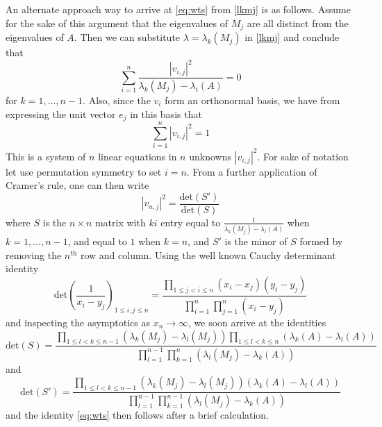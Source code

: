 \documentclass[12pt]{amsart}
\begin{document}
An alternate approach way to arrive at \eqref{eq:wts} from \eqref{lkmj} is as follows.  Assume for the sake of this argument that the eigenvalues of $M_j$ are all distinct from the eigenvalues of $A$.  Then we can substitute $\lambda = \lambda_k(M_j)$ in \eqref{lkmj} and conclude that
\begin{equation}\label{la}
\sum_{i=1}^n \frac{|v_{i,j}|^2}{\lambda_k(M_j) - \lambda_i(A)} = 0
\end{equation}
for $k=1,\dots,n-1$.  Also, since the $v_i$ form an orthonormal basis, we have from expressing the unit vector $e_j$ in this basis that
\begin{equation}\label{vij}
 \sum_{i=1}^n |v_{i,j}|^2 = 1
\end{equation}
This is a system of $n$ linear equations in $n$ unknowns $|v_{i,j}|^2$.  For sake of notation let use permutation symmetry to set $i=n$.  From a further application of Cramer's rule, one can then write
$$ |v_{n,j}|^2 = \frac{\mathrm{det}(S')}{\mathrm{det}(S)}$$
where $S$ is the $n \times n$ matrix with $ki$ entry equal to $\frac{1}{\lambda_k(M_j) - \lambda_i(A)}$ when $k=1,\dots,n-1$, and equal to $1$ when $k=n$, and $S'$ is the minor of $S$ formed by removing the $n^{\mathrm{th}}$ row and column.  Using the well known Cauchy determinant identity \cite{cauchy}
\begin{equation}\label{cauchy-det}
\mathrm{det} \left( \frac{1}{x_i-y_j} \right)_{1 \leq i,j \leq n} = \frac{\prod_{1 \leq j < i \leq n} (x_i-x_j)(y_i-y_j)}{\prod_{i=1}^n \prod_{j=1}^n (x_i-y_j)}
\end{equation}
and inspecting the asymptotics as $x_n \to \infty$, we soon arrive at the identities
$$ \mathrm{det}(S) = \frac{ \prod_{1 \leq l < k \leq n-1} (\lambda_k(M_j) - \lambda_l(M_j)) \prod_{1 \leq l < k \leq n} (\lambda_k(A) - \lambda_l(A))}{\prod_{l=1}^{n-1} \prod_{k=1}^n (\lambda_l(M_j) - \lambda_k(A))}$$
and
$$ \mathrm{det}(S') = \frac{ \prod_{1 \leq l < k \leq n-1} (\lambda_k(M_j) - \lambda_l(M_j)) (\lambda_k(A) - \lambda_l(A))}{\prod_{l=1}^{n-1} \prod_{k=1}^{n-1} (\lambda_l(M_j) - \lambda_k(A))}$$
and the identity \eqref{eq:wts} then follows after a brief calculation.
\end{document}
